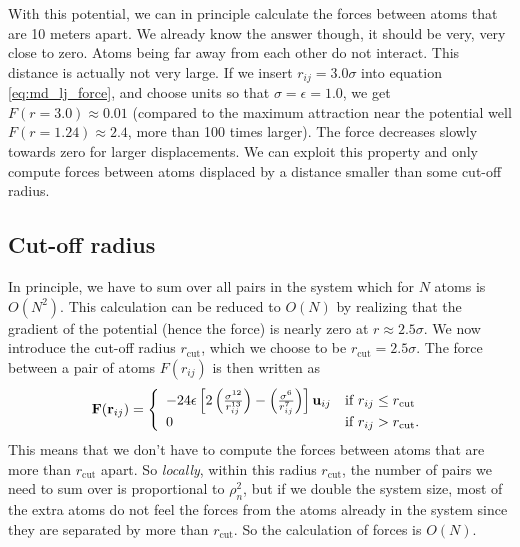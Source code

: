 With this potential, we can in principle calculate the forces between atoms that are 10 meters apart. We already know the answer though, it should be very, very close to zero. Atoms being far away from each other do not interact. This distance is actually not very large. If we insert $r_{ij} = 3.0\sigma$ into equation \eqref{eq:md_lj_force}, and choose units so that $\sigma = \epsilon = 1.0$, we get $F(r=3.0) \approx 0.01$ (compared to the maximum attraction near the potential well $F(r = 1.24) \approx 2.4$, more than 100 times larger). The force decreases slowly towards zero for larger displacements. We can exploit this property and only compute forces between atoms displaced by a distance smaller than some cut-off radius.
\subsection{Cut-off radius}
\label{sec:md_implementation_two_body_forces}
In principle, we have to sum over all pairs in the system which for $N$ atoms is $O(N^2)$. This calculation can be reduced to $O(N)$ by realizing that the gradient of the potential (hence the force) is nearly zero at $r \approx 2.5\sigma$. We now introduce the cut-off radius $r_\text{cut}$, which we choose to be $r_\text{cut} = 2.5\sigma$. The force between a pair of atoms $F(r_{ij})$ is then written as
\begin{align}
	\vec F(\vec r_{ij}) = \left\{
	\begin{array}{l l}
		-24\epsilon\left[2\left(\frac{\sigma^{12}}{r_{ij}^{13}}\right) - \left(\frac{\sigma^6}{r_{ij}^7}\right)\right]\vec u_{ij} & \text{if } r_{ij} \leq r_\text{cut}\\
		0 & \text{if } r_{ij} > r_\text{cut}.
	\end{array}\right .
\end{align}
This means that we don't have to compute the forces between atoms that are more than $r_\text{cut}$ apart. So \textit{locally}, within this radius $r_\text{cut}$, the number of pairs we need to sum over is proportional to $\rho_n^2$, but if we double the system size, most of the extra atoms do not feel the forces from the atoms already in the system since they are separated by more than $r_\text{cut}$. So the calculation of forces is $O(N)$.